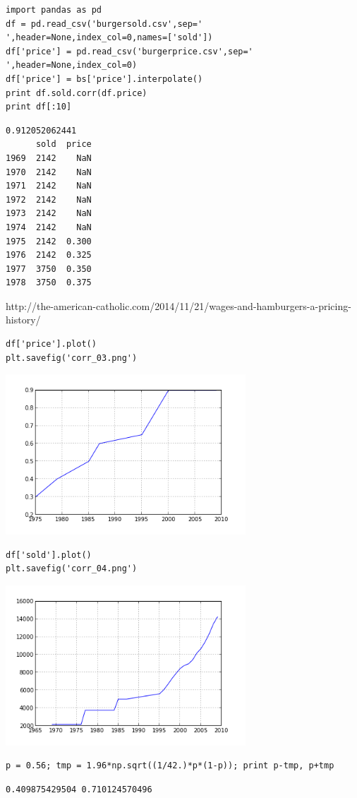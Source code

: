\documentclass[12pt,fleqn]{article}\usepackage{../common}
\begin{document}
\begin{verbatim}
import pandas as pd
df = pd.read_csv('burgersold.csv',sep=' ',header=None,index_col=0,names=['sold'])
df['price'] = pd.read_csv('burgerprice.csv',sep=' ',header=None,index_col=0)
df['price'] = bs['price'].interpolate()
print df.sold.corr(df.price)
print df[:10]
\end{verbatim}

\begin{verbatim}
0.912052062441
      sold  price
1969  2142    NaN
1970  2142    NaN
1971  2142    NaN
1972  2142    NaN
1973  2142    NaN
1974  2142    NaN
1975  2142  0.300
1976  2142  0.325
1977  3750  0.350
1978  3750  0.375
\end{verbatim}

http://the-american-catholic.com/2014/11/21/wages-and-hamburgers-a-pricing-history/

\begin{verbatim}
df['price'].plot()
plt.savefig('corr_03.png')
\end{verbatim}

\includegraphics[height=6cm]{corr_03.png}


\begin{verbatim}
df['sold'].plot()
plt.savefig('corr_04.png')
\end{verbatim}

\includegraphics[height=6cm]{corr_04.png}






\begin{verbatim}
p = 0.56; tmp = 1.96*np.sqrt((1/42.)*p*(1-p)); print p-tmp, p+tmp
\end{verbatim}

\begin{verbatim}
0.409875429504 0.710124570496
\end{verbatim}
\end{document}
